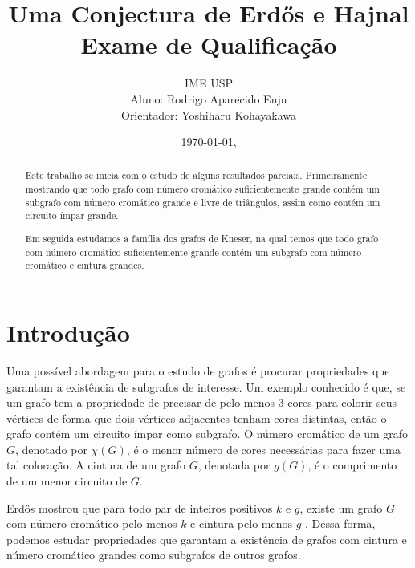 \documentclass{article}
\title{\textbf{Uma Conjectura de Erd\H{o}s e Hajnal}\\Exame de Qualificação}
\author{IME USP\\Aluno: Rodrigo Aparecido Enju\\Orientador: Yoshiharu Kohayakawa }
\date{}
\begin{document}
\linenumbers 
\shortdate
\yyyymmdddate
{}
\date{\today, \currenttime}
\renewcommand{\abstractname}{Resumo}
\onehalfspace

\maketitle
\begin{abstract}
    Este trabalho se inicia com o estudo de alguns resultados parciais. Primeiramente mostrando que todo grafo com número cromático suficientemente grande contém um subgrafo com número cromático grande e livre de triângulos, assim como contém um circuito ímpar grande.
    
    Em seguida estudamos a família dos grafos de Kneser, na qual temos que todo grafo com número cromático suficientemente grande contém um subgrafo com número cromático e cintura grandes.
\end{abstract}

\section{Introdução}


Uma possível abordagem para o estudo de grafos é procurar propriedades que garantam a existência de subgrafos de interesse. Um exemplo conhecido é que, se um grafo tem a propriedade de precisar de pelo menos $3$ cores para colorir seus vértices de forma que dois vértices adjacentes tenham cores distintas, então o grafo contém um circuito ímpar como subgrafo. O número cromático de um grafo $G$, denotado por $\chi(G)$, é o menor número de cores necessárias para fazer uma tal coloração. A cintura de um grafo $G$, denotada por $g(G)$, é o comprimento de um menor circuito de $G$.

Erd\H{o}s mostrou que para todo par de inteiros positivos $k$ e $g$, existe um grafo $G$ com número cromático pelo menos $k$ e cintura pelo menos $g$ \cite{erdos1959graph}. Dessa forma, podemos estudar propriedades que garantam a existência de grafos com cintura e número cromático grandes como subgrafos de outros grafos.
\end{document}
